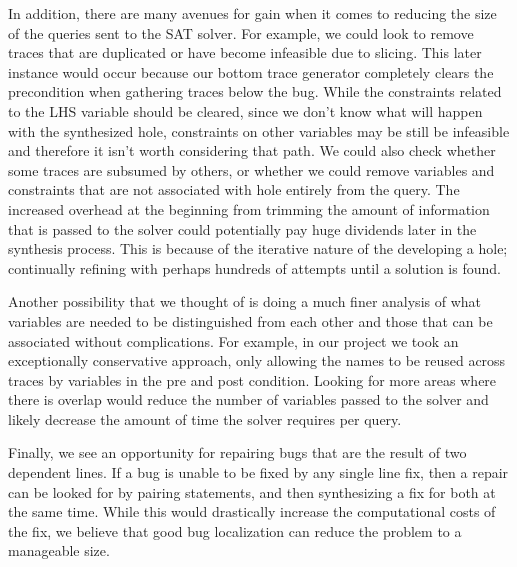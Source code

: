 \documentclass[]{article}
\begin{document}
In addition, there are many avenues for gain when it comes to reducing the size of the queries sent to the SAT solver.  For example, we could look to remove traces that are duplicated or have become infeasible due to slicing.  This later instance would occur because our bottom trace generator completely clears the precondition when gathering traces below the bug.  While the constraints related to the LHS variable should be cleared, since we don't know what will happen with the synthesized hole, constraints on other variables may be still be infeasible and therefore it isn't worth considering that path.  We could also check whether some traces are subsumed by others, or whether we could remove variables and constraints that are not associated with hole entirely from the query.  The increased overhead at the beginning from trimming the amount of information that is passed to the solver could potentially pay huge dividends later in the synthesis process.  This is because of the iterative nature of the developing a hole; continually refining with perhaps hundreds of attempts until a solution is found.  

Another possibility that we thought of is doing a much finer analysis of what variables are needed to be distinguished from each other and those that can be associated without complications.  For example, in our project we took an exceptionally conservative approach, only allowing the names to be reused across traces by variables in the pre and post condition.  Looking for more areas where there is overlap would reduce the number of variables passed to the solver and likely decrease the amount of time the solver requires per query.

Finally, we see an opportunity for repairing bugs that are the result of two dependent lines.  If a bug is unable to be fixed by any single line fix, then a repair can be looked for by pairing statements, and then synthesizing a fix for both at the same time.  While this would drastically increase the computational costs of the fix, we believe that good bug localization can reduce the problem to a manageable size.





\end{document}
